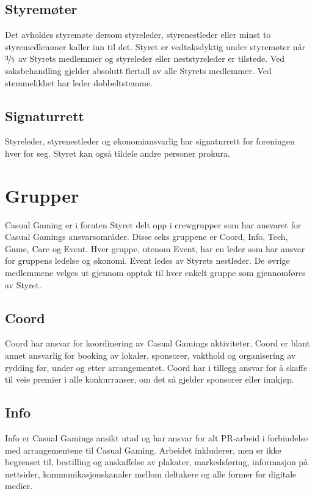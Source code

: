 \subsection{Styremøter}
Det avholdes styremøte dersom styreleder, styrenestleder eller minst to styremedlemmer kaller inn til det. Styret er vedtaksdyktig under styremøter når $\nicefrac{3}{5}$ av Styrets medlemmer og styreleder eller neststyreleder er tilstede. Ved saksbehandling gjelder absolutt flertall av alle Styrets medlemmer. Ved stemmelikhet har leder dobbeltstemme.

\subsection{Signaturrett}
Styreleder, styrenestleder og økonomiansvarlig har signaturrett for foreningen hver for seg. Styret kan også tildele andre personer prokura.

\section{Grupper}
Casual Gaming er i foruten Styret delt opp i crewgrupper som har ansvaret for Casual Gamings ansvarsområder. Disse seks gruppene er Coord, Info, Tech, Game, Care og Event. Hver gruppe, utenom Event, har en leder som har ansvar for gruppens ledelse og økonomi. Event ledes av Styrets nestleder. De øvrige medlemmene velges ut gjennom opptak til hver enkelt gruppe som gjennomføres av Styret.

\subsection{Coord}
Coord har ansvar for koordinering av Casual Gamings aktiviteter. Coord er blant annet ansvarlig for booking av lokaler, sponsorer, vakthold og organisering av rydding før, under og etter arrangementet. Coord har i tillegg ansvar for å skaffe til veie premier i alle konkurranser, om det så gjelder sponsorer eller innkjøp.

\subsection{Info}
Info er Casual Gamings ansikt utad og har ansvar for alt PR-arbeid i forbindelse med arrangementene til Casual Gaming. Arbeidet inkluderer, men er ikke begrenset til, bestilling og anskaffelse av plakater, markedsføring, informasjon på nettsider, kommunikasjonskanaler mellom deltakere og alle former for digitale medier.

